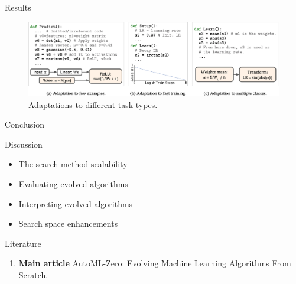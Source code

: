 \documentclass{beamer}
\begin{document}
\begin{frame}{Results}
 
    \begin{figure}
        \centering
        \includegraphics[scale=0.23]{adaptation.png}
        \caption{Adaptations to different task types.}
        \label{fig:adapt}
    \end{figure}
    
\end{frame}

\begin{frame}{Conclusion}
    \begin{block}{Discussion}
        \begin{itemize}
            \item The search method scalability
            \item Evaluating evolved algorithms\\
            \item Interpreting evolved algorithms
            \item Search space enhancements
        \end{itemize}
    \end{block}
\end{frame}

\begin{frame}{Literature}
    \begin{enumerate}
        \item \textbf{Main article} \href{https://proceedings.mlr.press/v119/real20a/real20a.pdf}
        {AutoML-Zero: Evolving Machine Learning Algorithms From Scratch}.
    \end{enumerate}
\end{frame}
\end{document}
